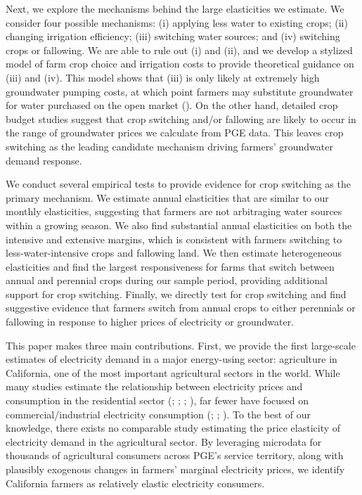 Next, we explore the mechanisms behind the large elasticities we estimate. 
We consider four possible mechanisms: (i) applying less water to existing crops; (ii) changing irrigation efficiency; (iii) switching water sources; and (iv) switching crops or fallowing. We are able to rule out (i) and (ii), and we develop a stylized model of farm crop choice and irrigation costs to provide theoretical guidance on (iii) and (iv). This model shows that (iii) is only likely at extremely high groundwater pumping costs, at which point farmers may substitute groundwater for water purchased on the open market (\textcite{hagerty2018}). On the other hand, detailed crop budget studies suggest that crop switching and/or fallowing are likely to occur in the range of groundwater prices we calculate from PGE data. This leaves crop switching as the leading candidate mechanism driving farmers' groundwater demand response.

We conduct several empirical tests to provide evidence for crop switching as the primary mechanism. We estimate annual elasticities that are similar to our monthly elasticities, suggesting that farmers are not arbitraging water sources within a growing season. We also find substantial annual elasticities on both the intensive and extensive margins, which is consistent with farmers switching to less-water-intensive crops and fallowing land. We then estimate heterogeneous elasticities and find the largest responsiveness for farms that switch between annual and perennial crops during our sample period, providing additional support for crop switching. Finally, we directly test for crop switching and find suggestive evidence that farmers switch from annual crops to either perennials or fallowing in response to higher prices of electricity or groundwater. 


This paper makes three main contributions. First, we provide the first large-scale estimates of electricity demand in a major energy-using sector: agriculture in California, one of the most important agricultural sectors in the world.
While many studies estimate the relationship between electricity prices and consumption in the residential sector (\textcite{alberini2011}; \textcite{fell2014}; \textcite{ito2014}; \textcite{deryugina2018}), far fewer have focused on commercial/industrial electricity consumption (\textcite{paul2009}; \textcite{jessoe2015}; \textcite{blonz2016}). To the best of our knowledge, there exists no comparable study estimating the price elasticity of electricity demand in the agricultural sector. By leveraging microdata for thousands of agricultural consumers across PGE's service territory, along with plausibly exogenous changes in farmers' marginal electricity prices, we identify California farmers as relatively elastic electricity consumers.

